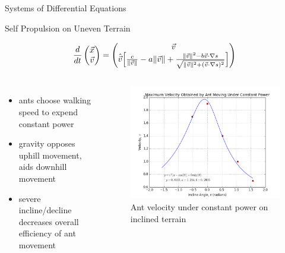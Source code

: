\begin{subsection}{Systems of Differential Equations}

\begin{frame}{Self 
Propulsion on Uneven Terrain}

\begin{align*}
\frac{d}{dt} \begin{pmatrix}\vec{x}\\\vec{v}\end{pmatrix} = \begin{pmatrix}\vec{v}\\ \hat{\vec{v}} \Big[ \frac{c}{\lVert\vec{v}\rVert} - a \lVert\vec{v}\rVert + \frac{\lVert\vec{v}\rVert^2 - b \vec{v} \cdot \nabla s}{\sqrt{\lVert\vec{v}\rVert^2 + (\vec{v} \cdot \nabla s)^2}} \Big] \end{pmatrix}
\end{align*}

\begin{columns}[T,onlytextwidth]

\small{
\begin{itemize}
    \item ants choose walking speed to expend constant power {\scriptsize\cite{holt_locomotion_2012}}
    \item gravity opposes uphill movement, aids downhill movement
    \item severe incline/decline decreases overall efficiency of ant movement
\end{itemize}
}
 \begin{figure}
    	\includegraphics[width=\textwidth]{images/const_power_velocity}
        \caption{Ant velocity under constant power on inclined terrain}
    \end{figure}
\end{columns}
\end{frame}

\end{subsection}
